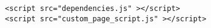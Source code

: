 \begin{lstlisting}[style=htmlcssjs]
<script src="dependencies.js" ></script>
<script src="custom_page_script.js" ></script>
\end{lstlisting}
